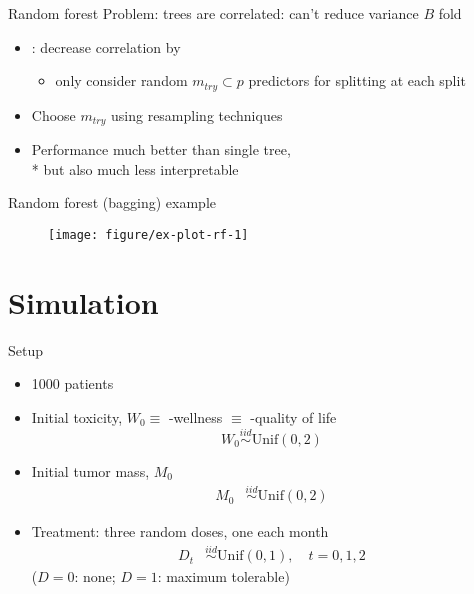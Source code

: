 \documentclass[handout]{beamer}
\begin{document}
\begin{frame}{Random forest}
  Problem: trees are correlated: can't reduce variance $B$ fold
  \begin{itemize}[<+->]
    \item \textcite{rf}: decrease correlation by 
    \begin{itemize}
      \item only consider random $m_{try} \subset p$ predictors for splitting at each split
    \end{itemize}
    \item Choose $m_{try}$ using resampling techniques
    \item Performance much better than single tree, \\* but also much less interpretable
  \end{itemize}
\end{frame}

\begin{frame}{Random forest (bagging) example}
  
  \begin{figure}[!htb]
  \begin{center}
    \texttt{[image: figure/ex-plot-rf-1]}
  \end{center}
  \end{figure}
  
\end{frame}



\section{Simulation} %
\label{sec:simulation}

\begin{frame}[c]{Setup}
  \begin{itemize}[<+->]
    \item 1000 patients
    
  \item Initial toxicity, $W_{0} \equiv$ -wellness $\equiv$ -quality of life
  \begin{equation*}
    W_{0} \overset{iid}{\sim} \text{Unif}(0, 2)
  \end{equation*}
  
  \item Initial tumor mass, $M_{0}$
  \begin{align*}
    M_{0} &\overset{iid}{\sim} \text{Unif}(0, 2)
  \end{align*}
  
  \item Treatment: three random doses, one each month
  \begin{align*}
    D_{t} &\overset{iid}{\sim} \text{Unif}(0, 1), \quad t = 0, 1, 2
  \end{align*}
  ($D = 0$: none; $D = 1$: maximum tolerable)
  \end{itemize}
\end{frame}
\end{document}
